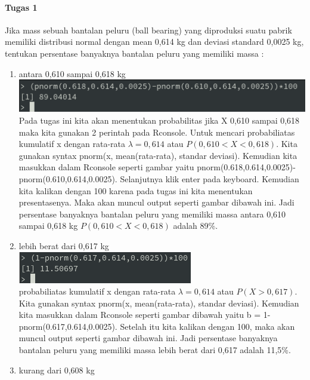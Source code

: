 \documentclass[a4paper,12pt]{article}
\begin{document}
\paragraph{Tugas 1\\}
Jika mass sebuah bantalan peluru (ball bearing) yang diproduksi suatu pabrik memiliki distribusi normal dengan mean 0,614 kg dan deviasi standard 0,0025 kg, tentukan persentase banyaknya bantalan peluru yang memiliki massa :
\begin{enumerate}[label=\alph*.]
    \item antara 0,610 sampai 0,618 kg\\
        \includegraphics[width=\linewidth]{tugas1a}\\
        Pada tugas ini kita akan menentukan probabilitas jika X 0,610 sampai 0,618 maka kita gunakan 2 perintah pada Rconsole. Untuk mencari probabiliatas kumulatif x dengan rata-rata $\lambda = 0,614$ atau $P(0,610 < X < 0,618)$. Kita gunakan syntax pnorm(x, mean(rata-rata), standar deviasi). Kemudian kita masukkan dalam Rconsole seperti gambar yaitu pnorm(0.618,0.614,0.0025)-pnorm(0.610,0.614,0.0025). Selanjutnya klik enter pada keyboard. Kemudian kita kalikan dengan 100 karena pada tugas ini
        kita menentukan presentasenya. Maka akan muncul output seperti gambar dibawah ini. Jadi persentase banyaknya bantalan peluru yang memiliki massa antara 0,610 sampai 0,618 kg $P(0,610 < X < 0,618)$ adalah 89\%.
    \item lebih berat dari 0,617 kg\\
        \includegraphics{tugas1b}\\
        probabiliatas kumulatif x dengan rata-rata $\lambda = 0,614$ atau $P(X > 0,617)$. Kita gunakan syntax pnorm(x, mean(rata-rata), standar deviasi). Kemudian kita masukkan dalam Rconsole seperti gambar dibawah yaitu  b = 1-pnorm(0.617,0.614,0.0025). Setelah itu kita kalikan dengan 100, maka akan muncul output seperti gambar dibawah ini. Jadi persentase banyaknya bantalan peluru yang memiliki massa lebih berat dari 0,617 adalah 11,5\%.
    \item kurang dari 0,608 kg\\

\end{enumerate}
\end{document}
